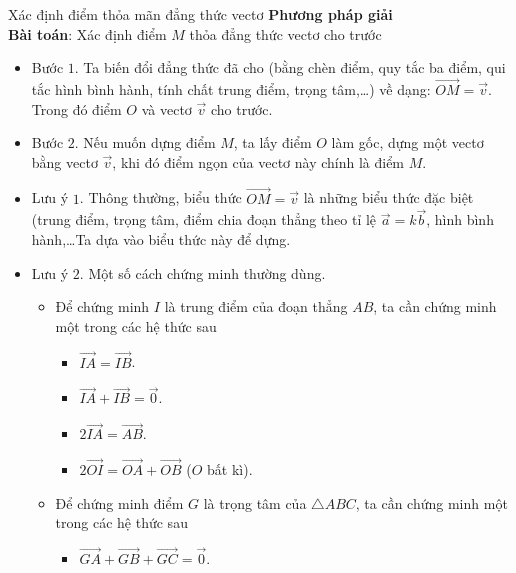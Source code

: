 \begin{dang}{Xác định điểm thỏa mãn đẳng thức vectơ}%
	\textbf{Phương pháp giải}\\
	\textbf{Bài toán}: Xác định điểm $M$ thỏa đẳng thức vectơ cho trước
	\begin{itemize}
		\item Bước $1$. Ta biến đổi đẳng thức đã cho (bằng chèn điểm, quy tắc ba điểm, qui tắc hình bình hành, tính chất trung điểm, trọng tâm,\ldots ) về dạng: $\overrightarrow{OM}=\overrightarrow{v}$. Trong đó điểm $O$  và vectơ $\overrightarrow{v}$ cho trước.
		\item Bước $2$. Nếu muốn dựng điểm $M$, ta lấy điểm $O$ làm gốc, dựng một vectơ bằng vectơ $\overrightarrow{v}$, khi đó điểm ngọn của vectơ này chính là điểm $M$.
	\end{itemize}
	\begin{note}
		\begin{itemize}
			\item Lưu ý $1$. Thông thường, biểu thức $\overrightarrow{OM}=\overrightarrow{v}$ là những biểu thức đặc biệt (trung điểm, trọng tâm, điểm chia đoạn thẳng theo tỉ lệ $\overrightarrow{a}=k\overrightarrow{b}$, hình bình hành,\ldots Ta dựa vào biểu thức này để dựng.
			\item Lưu ý $2$. Một số cách chứng minh thường dùng.
			      \begin{itemize}
				      \item Để chứng minh $I$ là trung điểm của đoạn thẳng $AB$, ta cần chứng minh một trong các hệ thức sau
				            \begin{itemize}
					            \item  $\overrightarrow{IA}=\overrightarrow{IB}$.
					            \item $\overrightarrow{IA}+\overrightarrow{IB}=\overrightarrow{0}$.
					            \item $2\overrightarrow{IA}=\overrightarrow{AB}$.
					            \item $2\overrightarrow{OI}=\overrightarrow{OA}+\overrightarrow{OB}$ ($O$ bất kì).
				            \end{itemize}
				      \item Để chứng minh điểm $G$ là trọng tâm của $\triangle ABC$, ta cần chứng minh một trong các hệ thức sau
				            \begin{itemize}
					            \item $\overrightarrow{GA}+\overrightarrow{GB}+\overrightarrow{GC}=\overrightarrow{0}$.

\end{itemize}
\end{itemize}
\end{itemize}
\end{note}
\end{dang}
